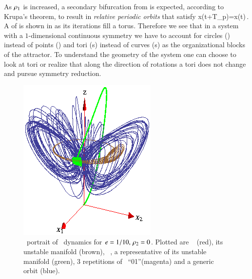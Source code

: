 As $\rho_1$ is increased,  a secondary bifurcation from  
is expected, according to Krupa's
theorem, to result in \emph{relative periodic
orbits} that satisfy
\beq
	x(t+T_p)=x(t)\,.
\eeq
A {\rpo} of {\cLe} is shown in  as its iterations fill
a torus. Therefore we see that in a system with a $1$-dimensional
continuous symmetry we have to account for circles (\reqva) instead of points (\eqva)
and tori (\rpo s) instead of curves (\po s) as the organizational blocks of the attractor.
To understand the geometry of the system one can choose to look at tori or realize
that along the direction of rotations a tori does not change and pursue symmetry
reduction.



\begin{figure}[ht]
\begin{center}
  \includegraphics[height=0.25\textheight]{../figs/CLE}
\end{center}
\caption[Complex Lorenz flow phase space]
{ \Statesp\ portrait of \cLe\ dynamics for $e=1/10,\,
\rho_2=0$. Plotted are \reqv\  (red), its unstable
manifold (brown), \eqv\ , a representative of its
unstable manifold (green), 3 repetitions of \rpo\
``01''(magenta) and a generic orbit (blue).}
\label{fig:CLE}
\end{figure}
%

